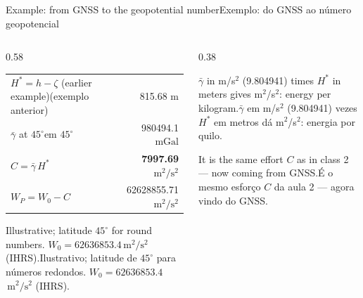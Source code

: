 \documentclass[aspectratio=169,11pt]{beamer}
\newcommand{\tr}[2]{\ifEN#2\else#1\fi}
\newcommand{\bnum}[1]{\textbf{\textcolor{mTeal}{#1}}}
\newcommand{\mGal}{\ensuremath{\,\mathrm{mGal}}\xspace}
\newcommand{\mmss}{\ensuremath{\,\mathrm{m^2/s^2}}\xspace}
\begin{document}
\begin{frame}{\tr{Exemplo: do GNSS ao número geopotencial}{Example: from GNSS to the
  geopotential number}}
  \begin{columns}[T]
    \begin{column}{0.58\textwidth}
      \centering
      \small
      \renewcommand{\arraystretch}{1.35}
      \begin{tabular}{lr}
        \toprule
        $H^{*} = h - \zeta$ \tr{(exemplo anterior)}{(earlier example)} & \num{815.68} m \\
        $\bar\gamma$ \tr{em $45^{\circ}$}{at $45^{\circ}$} &
          \num{980494.1}\mGal \\
        $C = \bar\gamma\,H^{*}$ & \bnum{\num{7997.69}}\mmss \\
        $W_P = W_0 - C$ & \num{62628855.71}\mmss \\
        \bottomrule
      \end{tabular}
      \par\smallskip
      {\scriptsize\textcolor{mStoneMid}{\tr{Ilustrativo; latitude de $45^{\circ}$ para
      números redondos. $W_0 = \num{62636853.4}$\mmss{} (IHRS).}{Illustrative; latitude
      $45^{\circ}$ for round numbers. $W_0 = \num{62636853.4}$\mmss{} (IHRS).}}}
    \end{column}
    \begin{column}{0.38\textwidth}
      \begin{cuidado}[title={\tr{Repare nas unidades}{Watch the units}}]
        \footnotesize\tr{$\bar\gamma$ em m/s$^2$ (\num{9.804941}) vezes $H^{*}$ em metros dá
        m$^2$/s$^2$: energia por quilo.}{$\bar\gamma$ in m/s$^2$ (\num{9.804941}) times $H^{*}$
        in meters gives m$^2$/s$^2$: energy per kilogram.}
        \medskip

        \tr{É o mesmo esforço $C$ da aula 2 --- agora vindo do GNSS.}{It is the same effort
        $C$ as in class 2 --- now coming from GNSS.}
      \end{cuidado}
    \end{column}
  \end{columns}
\end{frame}
\end{document}
